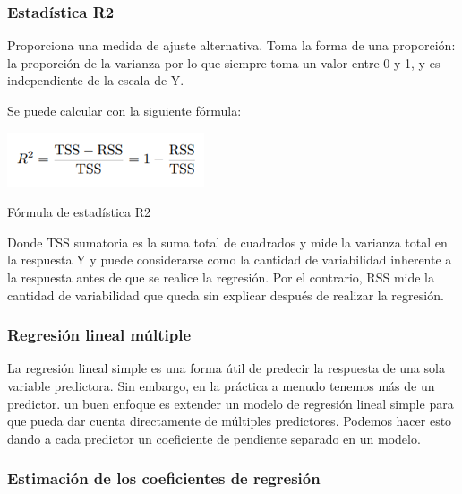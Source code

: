 \documentclass[
  letterpaper,
  DIV=11,
  numbers=noendperiod]{scrartcl}
\begin{document}
\hypertarget{estaduxedstica-r2}{%
\subsubsection{\texorpdfstring{\textbf{Estadística
R2}}{Estadística R2}}\label{estaduxedstica-r2}}

Proporciona una medida de ajuste alternativa. Toma la forma de una
proporción: la proporción de la varianza por lo que siempre toma un
valor entre 0 y 1, y es independiente de la escala de Y.

Se puede calcular con la siguiente fórmula:

\begin{Fórmula de estadística R2}

{\centering \includegraphics{f4.png}

}

\caption{Fórmula de estadística R2}

\end{Fórmula de estadística R2}

Donde TSS sumatoria es la suma total de cuadrados y mide la varianza
total en la respuesta Y y puede considerarse como la cantidad de
variabilidad inherente a la respuesta antes de que se realice la
regresión. Por el contrario, RSS mide la cantidad de variabilidad que
queda sin explicar después de realizar la regresión.

\hypertarget{regresiuxf3n-lineal-muxfaltiple}{%
\subsubsection{\texorpdfstring{\textbf{Regresión lineal
múltiple}}{Regresión lineal múltiple}}\label{regresiuxf3n-lineal-muxfaltiple}}

La regresión lineal simple es una forma útil de predecir la respuesta de
una sola variable predictora. Sin embargo, en la práctica a menudo
tenemos más de un predictor. un buen enfoque es extender un modelo de
regresión lineal simple para que pueda dar cuenta directamente de
múltiples predictores. Podemos hacer esto dando a cada predictor un
coeficiente de pendiente separado en un modelo.

\hypertarget{estimaciuxf3n-de-los-coeficientes-de-regresiuxf3n}{%
\subsubsection{\texorpdfstring{\textbf{Estimación de los coeficientes de
regresión}}{Estimación de los coeficientes de regresión}}\label{estimaciuxf3n-de-los-coeficientes-de-regresiuxf3n}}
\end{document}
